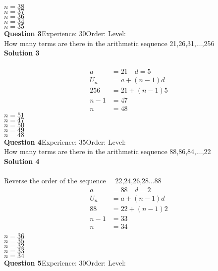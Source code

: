 \documentclass{article}
\begin{document}
$n=38$\\
$n=37$\\
$n=36$\\
$n=34$\\
$n=35$\\
\noindent\textbf{Question 3}\hspace{20pt}Experience: 30\hspace{20pt}Order: \hspace{20pt}Level: \\[2pt]
How many terms are there in the arithmetic sequence 21,26,31,...,256\\[4pt]
\noindent\textbf{Solution 3}\\[2pt]
\\[-10pt]\begin{align*}
a&=21 \quad d=5\\[2pt]
U_n&=a+(n-1)d\\[2pt]
256&=21+(n-1)5\\[2pt]
n-1&=47\\[2pt]
n&=48
\end{align*}
$n=51$\\
$n=47$\\
$n=50$\\
$n=49$\\
$n=48$\\
\noindent\textbf{Question 4}\hspace{20pt}Experience: 35\hspace{20pt}Order: \hspace{20pt}Level: \\[2pt]
How many terms are there in the arithmetic sequence 88,86,84,...,22\\[4pt]
\noindent\textbf{Solution 4}\\[2pt]
\\[-10pt]Reverse the order of the sequence$\quad$ 22,24,26,28...88
\begin{align*}
a&=88 \quad d=2\\[2pt]
U_n&=a+(n-1)d\\[2pt]
88&=22+(n-1)2\\[2pt]
n-1&=33\\[2pt]
n&=34\\[-100pt]
\end{align*}
$n=36$\\
$n=35$\\
$n=32$\\
$n=33$\\
$n=34$\\
\noindent\textbf{Question 5}\hspace{20pt}Experience: 30\hspace{20pt}Order: \hspace{20pt}Level: \\[2pt]
\end{document}
